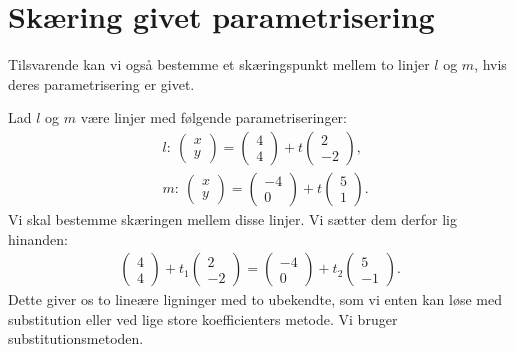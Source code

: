 \section*{Skæring givet parametrisering}
Tilsvarende kan vi også bestemme et skæringspunkt mellem to linjer $l$ og $m$, hvis deres parametrisering er givet. 
\begin{exa}
	Lad $l$ og $m$ være linjer med følgende parametriseringer:
	\begin{align*}
		&l: \ 
		\begin{pmatrix}
			x \\ y
		\end{pmatrix} = 
		\begin{pmatrix}
			4 \\ 4
		\end{pmatrix} + t
		\begin{pmatrix}
			2 \\ -2
		\end{pmatrix},\\
		&m: \ 
		\begin{pmatrix}
			x \\ y 
		\end{pmatrix} = 
		\begin{pmatrix}
			-4 \\ 0
		\end{pmatrix} + t
		\begin{pmatrix}
			5 \\ 1
		\end{pmatrix}.
	\end{align*}
	Vi skal bestemme skæringen mellem disse linjer. Vi sætter dem derfor lig hinanden:
	\begin{align*}
		\begin{pmatrix}
			4 \\ 4
		\end{pmatrix} + t_1
		\begin{pmatrix}
			2 \\ -2
		\end{pmatrix} =
		\begin{pmatrix}
			-4 \\ 0
		\end{pmatrix} + t_2
		\begin{pmatrix}
			5 \\ -1
		\end{pmatrix}.
	\end{align*}
	Dette giver os to lineære ligninger med to ubekendte, som vi enten kan løse med 
	substitution eller ved lige store koefficienters metode. Vi bruger substitutionsmetoden. 

\end{exa}
